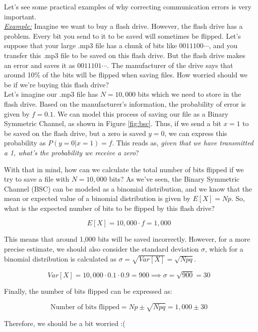 \documentclass[a4paper,10pt]{article}
\begin{document}
Let's see some practical examples of why correcting communication errors is very important.\\

\noindent \underline{\textit{Example:}} Imagine we want to buy a flash drive. However, the flash drive has a problem. Every bit you send to it to be saved will sometimes be flipped. Let's suppose that your large .mp3 file has a chunk of bits like $0011100\cdots$, and you transfer this .mp3 file to be saved on this flash drive. But the flash drive makes an error and saves it as $0011101\cdots$. The manufacturer of the drive says that around 10\% of the bits will be flipped when saving files. How worried should we be if we're buying this flash drive?\\


Let's imagine our .mp3 file has $N = 10,000$ bits which we need to store in the flash drive. Based on the manufacturer's information, the probability of error is given by $f = 0.1$. We can model this process of saving our file as a Binary Symmetric Channel, as shown in Figure \ref{fig:bsc}. Thus, if we send a bit $x = 1$ to be saved on the flash drive, but a zero is saved $y = 0$, we can express this probability as $P(y = 0 | x = 1) = f$. This reads as, \textit{given that we have transmitted a 1, what's the probability we receive a zero}?

With that in mind, how can we calculate the total number of bits flipped if we try to save a file with $N = 10,000$ bits? As we've seen, the Binary Symmetric Channel (BSC) can be modeled as a binomial distribution, and we know that the mean or expected value of a binomial distribution is given by $E[X] = Np$. So, what is the expected number of bits to be flipped by this flash drive?

$$
E[X] = 10,000 \cdot f = 1,000
$$

This means that around 1,000 bits will be saved incorrectly. However, for a more precise estimate, we should also consider the standard deviation $\sigma$, which for a binomial distribution is calculated as $\sigma = \sqrt{Var[X]} = \sqrt{Npq}$.

$$
Var[X] = 10,000 \cdot 0.1 \cdot 0.9 = 900 \implies \sigma = \sqrt{900} = 30
$$

Finally, the number of bits flipped can be expressed as:

$$  
\text{Number of bits flipped} = Np \pm \sqrt{Npq} = 1,000 \pm 30
$$

Therefore, we should be a bit worried :(\\
\end{document}
